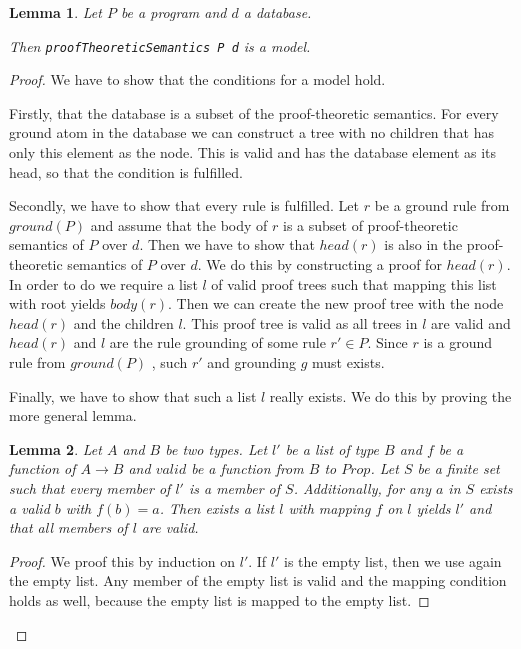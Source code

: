 \documentclass{article}
\newtheorem{lemma}{Lemma}
\begin{document}
        \begin{lemma}
            Let $P$ be a program and $d$ a database.

            Then \texttt{proofTheoreticSemantics P d} is a model.
        \end{lemma}
        \begin{proof}
            We have to show that the conditions for a model hold.

            Firstly, that the database is a subset of the proof-theoretic semantics. For every ground atom in the database we can construct a tree with no children that has only this element as the node. This is valid and has the database element as its head, so that the condition is fulfilled.

            Secondly, we have to show that every rule is fulfilled. Let $r$ be a ground rule from $ground(P)$ and assume that the body of $r$ is a subset of proof-theoretic semantics of $P$ over $d$. Then we have to show that $head(r)$ is also in the proof-theoretic semantics of $P$ over $d$. We do this by constructing a proof for $head(r)$. In order to do we require a list $l$ of valid proof trees such that mapping this list with root yields $body(r)$. Then we can create the new proof tree with the node $head(r)$ and the children $l$. This proof tree is valid as all trees in $l$ are valid and $head(r)$ and $l$ are the rule grounding of some rule $r' \in P$. Since $r$ is a ground rule from $ground(P)$ , such $r'$ and grounding $g$ must exists.

            Finally, we have to show that such a list $l$ really exists. We do this by proving the more general lemma.

            \begin{lemma}
                Let $A$ and $B$ be two types. Let $l'$ be a list of type $B$ and $f$ be a function of $A \to B$ and $valid$ be a function from $B$ to $Prop$. Let $S$ be a finite set such that every member of $l'$ is a member of $S$. Additionally, for any $a$ in $S$ exists a valid $b$ with $f(b) = a$. Then exists a list $l$ with mapping $f$ on $l$ yields $l'$ and that all members of $l$ are valid.
            \end{lemma}
            \begin{proof}
                We proof this by induction on $l'$.
                If $l'$ is the empty list, then we use again the empty list. Any member of the empty list is valid and the mapping condition holds as well, because the empty list is mapped to the empty list.


\end{proof}
\end{proof}
\end{document}
